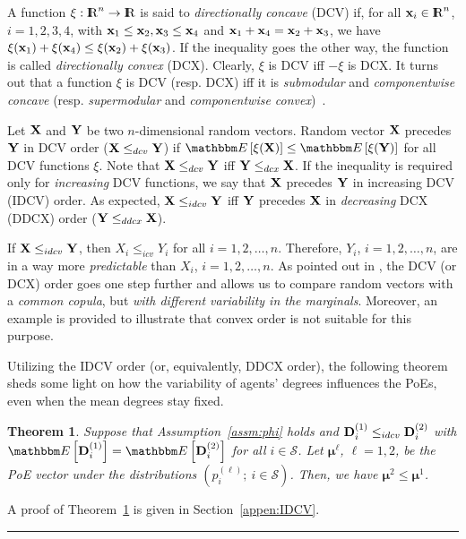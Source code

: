\documentclass[10pt, journal, compsoc]{IEEEtran}
\newcommand {\cS}{{\mathcal{S}}}
\newcommand {\bX} {{\bf X}}
\newcommand {\bY} {{\bf Y}}
\newcommand {\bx} {{\bf x}}
\newcommand {\bmu} {\boldsymbol{\mu}}
\newcommand {\R} {{\rm I\kern-2.5pt R}}
\newtheorem{theorem}{Theorem}
\newcommand{\E}[1]{{\mathbbm E}\left[ #1 \right]}
\def\QED{~\rule[-1pt]{5pt}{5pt}\par\medskip}
\newenvironment{proof}{{\bf Proof: \ }}{ \hfill \QED}
\begin{document}
A function $\xi: \R^n \to \R$ is said to 
{\em directionally concave} (DCV) if, for all 
$\bx_i \in \R^n$, $i = 1, 2, 3, 4$, with 
$\bx_1 \leq \bx_2, \bx_3 \leq \bx_4$
and $\bx_1 + \bx_4 = \bx_2 + \bx_3$, we have
$\xi(\bx_1) + \xi(\bx_4)
\leq \xi(\bx_2) + \xi(\bx_3)$. 
If the inequality goes the other way, the 
function is called {\em directionally 
convex} (DCX). Clearly, $\xi$ is DCV iff  
$-\xi$ is DCX. It turns out that 
a function $\xi$ is DCV (resp. DCX) iff 
it is {\em submodular} and {\em componentwise 
concave} (resp. {\em supermodular} and 
{\em componentwise convex})~\cite[p. 335]{SO}. 

Let $\bX$ and $\bY$ be two $n$-dimensional random 
vectors. Random vector $\bX$ precedes $\bY$ in 
DCV order ($\bX \leq_{dcv} \bY$) if $\E{\xi(\bX)} 
\leq \E{\xi(\bY)}$ for all DCV functions $\xi$. 
Note that $\bX \leq_{dcv} \bY$ iff
$\bY \leq_{dcx} \bX$. If the inequality
is required only for {\em increasing} 
DCV functions, we say that $\bX$ precedes $\bY$ 
in increasing DCV (IDCV) order. As expected,
$\bX \leq_{idcv} \bY$ iff $\bY$ precedes $\bX$ in 
{\em decreasing} DCX (DDCX) order
($\bY \leq_{ddcx} \bX$). 

If $\bX \leq_{idcv} \bY$, 
then $X_i \leq_{icv} Y_i$ for all $i = 1, 
2, \ldots, n$. Therefore, $Y_i$, $i = 1, 2, 
\ldots, n$, are in a way more 
{\em predictable} than $X_i$, $i = 1, 2, 
\ldots, n$. 
As pointed out in \cite[p. 135]{MullerStoyan}, 
the DCV (or DCX) order goes one
step further and allows us to compare 
random vectors with a {\em common copula}, but 
{\em with different variability in the 
marginals}. Moreover, 
an example is provided to illustrate that
convex order is not suitable for this purpose.

Utilizing the IDCV order (or, equivalently, DDCX
order), the following theorem sheds some light 
on how the variability of agents' degrees influences
the PoEs, even when the mean degrees stay fixed. 


\begin{theorem}	\label{thm:IDCV}
Suppose that Assumption~\ref{assm:phi} holds
and ${\bf D}^{(1)}_i \leq_{idcv}
{\bf D}^{(2)}_i$ with $\E{{\bf D}^{(1)}_i}
= \E{{\bf D}^{(2)}_i}$ for
all $i \in \cS$. Let $\bmu^\ell$, $\ell = 1, 2$,
be the PoE vector under the distributions 
$(p^{(\ell)}_i; \ i \in \cS)$. Then, 
we have $\bmu^2 \leq \bmu^1$. 
\end{theorem}
\begin{proof}
A proof of Theorem~\ref{thm:IDCV} is given in 
Section~\ref{appen:IDCV}. 
\end{proof}
 
\end{document}
